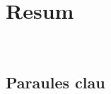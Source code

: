 \chapter*{Resum}\label{ch:abstract-ca}

\noindent \\
\section*{Paraules clau}\label{sec:keywords-ca}
